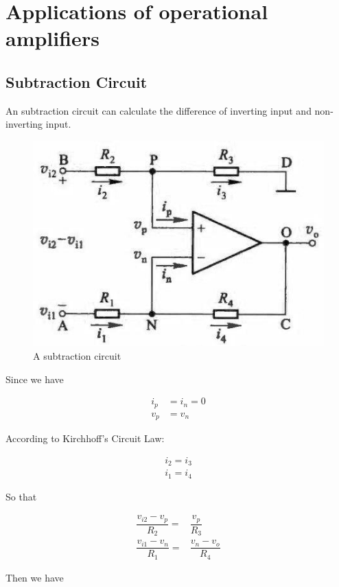 \section{Applications of operational amplifiers}

\subsection{Subtraction Circuit}

An subtraction circuit can calculate the difference of inverting input and non-inverting input.

\begin{figure}[H]
  \centering
  \includegraphics[width=0.4\linewidth]{figures/subtraction-amplifier}
  \caption{A subtraction circuit}
  \label{fig:}
\end{figure}

Since we have

\begin{equation*}
  \begin{aligned}
    i_p &= i_n = 0 \\
    v_p &= v_n
  \end{aligned}
\end{equation*}

According to Kirchhoff's Circuit Law:

\begin{equation*}
  \begin{aligned}
    i_2 = i_3 \\
    i_1 = i_4
  \end{aligned}
\end{equation*}

So that

\begin{equation*}
  \begin{aligned}
    \dfrac{v_{i2} - v_p}{R_2} =& \dfrac{v_p}{R_3} \\
    \dfrac{v_{i1} - v_n}{R_1} =& \dfrac{v_n - v_o}{R_4}  
  \end{aligned}
\end{equation*}

Then we have

